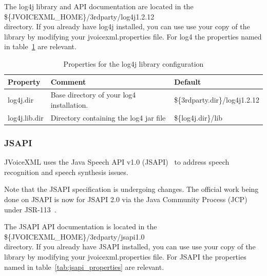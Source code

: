 \documentclass[11pt,a4paper]{article}
\begin{document}
The log4j library and API documentation are located in the \\
\$\{JVOICEXML\_HOME\}/3rdparty/log4j1.2.12 \\
directory. If you already have log4j installed, you can use
use your copy of the library by modifying your jvoicexml.properties file.
For log4 the properties named in table~\ref{tab:log4_properties} are relevant.

\begin{table}[h]
\caption{Properties for the log4j library configuration}
\label{tab:log4_properties}

\begin{center}

\begin{tabular}{|l|p{4cm}|l|}
\hline
\textbf{Property} & \textbf{Comment} & \textbf{Default} \\
\hline
\hline
log4j.dir & 
Base directory of your log4 installation.
& \$\{3rdparty.dir\}/log4j1.2.12 \\
\hline
log4j.lib.dir & 
Directory containing the log4 jar file 
& \$\{log4j.dir\}/lib \\
\hline
\end{tabular}
\end{center}

\end{table}

\subsubsection{JSAPI}
\label{sec:jsapi}

JVoiceXML uses the Java Speech API v1.0 (JSAPI)~\cite{sun:jsapi} to address 
speech recognition and speech synthesis issues.

Note that the JSAPI specification is undergoing changes.
The official work being done on JSAPI is now for JSAPI 2.0 via
the Java Community Process (JCP)~\cite{jcp} under 
JSR-113~\cite{jcp:jsr113}.

The JSAPI API documentation is located in the \\
\$\{JVOICEXML\_HOME\}/3rdparty/jsapi1.0 \\
directory. If you already have JSAPI installed, you can use
use your copy of the library by modifying your jvoicexml.properties file.
For JSAPI the properties named in table~\ref{tab:jsapi_properties} are 
relevant.
\end{document}
